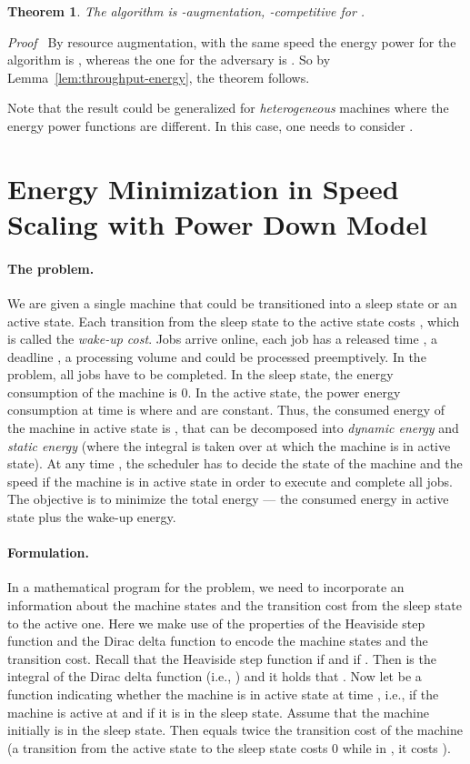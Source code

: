 \documentclass[11pt]{article}
\newenvironment{proof}{\noindent\emph{Proof\ }}{\hspace*{\fill}\medskip}
\newtheorem{theorem}{Theorem}
\begin{document}
\begin{theorem}
The algorithm is -augmentation, -competitive
for . 
\end{theorem}
\begin{proof}
By resource augmentation, with the same speed  the energy power 
for the algorithm is , 
whereas the one for the adversary is . So by 
Lemma~\ref{lem:throughput-energy}, the theorem follows.
\end{proof}

Note that the result could be generalized for \emph{heterogeneous} machines 
where the energy power functions are different. In this case, one needs to consider 
.

\section{Energy Minimization in Speed Scaling with Power Down Model}		\label{sec:4S-energy}
\paragraph{The problem.} 
We are given a single machine that could be transitioned into 
a sleep state or an active state.  Each transition from the sleep state to 
the active state costs , which is called the \emph{wake-up cost}. 
Jobs arrive online, each job has a released time , a deadline , 
a processing volume  and could be processed preemptively. In the problem,
all jobs have to be completed. In the sleep state, the energy consumption of the machine is 0.
In the active state, the power energy consumption at time  is 
where  and  are constant. Thus, the consumed energy of the machine 
in active state is , that can be decomposed into 
\emph{dynamic energy}  and 
\emph{static energy}  (where the integral is taken over  at which 
the machine is in active state). At any time , 
the scheduler has to decide the state of the machine and the speed if the machine is in active state 
in order to execute and complete all jobs. 
The objective is to minimize the total energy --- the consumed energy in active state plus the 
wake-up energy. 

\paragraph{Formulation.} In a mathematical program for the problem, we need to incorporate an information 
about the machine states and the transition cost from the sleep state to the active one.  
Here we make use of 
the properties of the Heaviside step function and the Dirac delta function to encode 
the machine states and the transition cost. Recall that the Heaviside step 
function  if  and  if . Then 
is the integral of the Dirac delta function  (i.e., ) and it holds that 
. Now let  be a function
indicating whether the machine is in active state at time , i.e.,  if 
the machine is active at  and  if it is in the sleep state. 
Assume that the machine initially is in the sleep state. Then
 equals twice the transition cost
of the machine (a transition from the active state to the sleep state costs 0 while 
in , it costs ).
\end{document}
